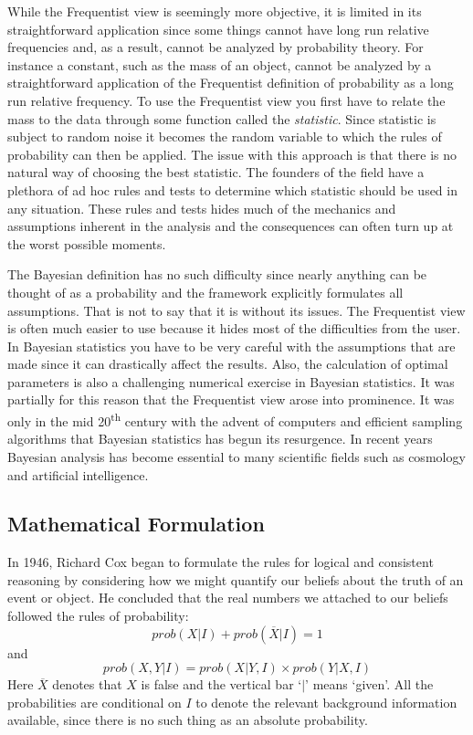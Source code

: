 \documentclass[12pt]{article}
\numberwithin{equation}{section}
\begin{document}
While the Frequentist view is seemingly more objective, it is limited 
in its straightforward application since some things cannot have long 
run relative frequencies and, as a result, cannot be analyzed by 
probability theory. For instance a constant, such as the mass of an 
object, cannot be analyzed by a straightforward application of the 
Frequentist definition of probability as a long run relative frequency. 
To use the Frequentist view you first have to relate the mass to the 
data through some function called the \emph{statistic}. Since 
statistic is subject to random noise it becomes the random variable to 
which the rules of probability can then be applied. The issue with this 
approach is that there is no natural way of choosing the best 
statistic.\cite{sivia2006data} The founders of the field have a 	
plethora of ad hoc rules and tests to determine which statistic should 
be used in any situation. These rules and tests hides much of the 	
mechanics and assumptions inherent in the analysis and the consequences 
can often turn up at the worst possible moments.

The Bayesian definition has no such difficulty since nearly anything 
can be thought of as a probability and the framework explicitly 
formulates all assumptions. That is not to say that it is without its 
issues. The Frequentist view is often much easier to use because it 
hides most of the difficulties from the user. In Bayesian statistics 
you have to be very careful with the assumptions that are made since it 
can drastically affect the results. Also, the calculation of optimal 
parameters is also a challenging numerical exercise in Bayesian 
statistics. It was partially for this reason that the Frequentist view 
arose into prominence. It was only in the mid 20\textsuperscript{th} 
century with the advent of computers and efficient sampling algorithms 
that Bayesian statistics has begun its resurgence. In recent years 
Bayesian analysis has become essential to many scientific fields such 
as cosmology and artificial intelligence.\cite{von2011bayesian}
\subsection{Mathematical Formulation}
In 1946, Richard Cox began to formulate the rules for logical and consistent
reasoning by considering how we might quantify our beliefs about the truth of 
an event or object. He concluded that the real numbers we attached to our
beliefs followed the rules of probability:\cite{sivia2006data} 
\begin{equation} \label{eq:sumrule}
	prob(X|I) + prob(\overline{X}|I) = 1
\end{equation}
and 
\begin{equation} \label{eq:productrule}
	prob(X,Y|I) = prob(X|Y,I) \times prob(Y|X,I)
\end{equation}
Here $\overline{X}$ denotes that $X$ is false and the vertical bar `$|$' means `given'. 
All the probabilities are conditional on $I$ to denote the relevant background information 
available, since there is no such thing as an absolute probability. 
\end{document}
